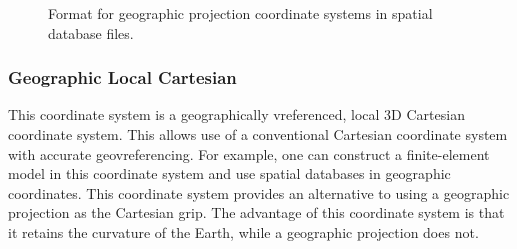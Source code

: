 \begin{figure}[H]
\caption{Format for geographic projection coordinate systems in spatial database
files.}
\end{figure}



\subsubsection{Geographic Local Cartesian}

This coordinate system is a geographically vreferenced, local 3D Cartesian
coordinate system. This allows use of a conventional Cartesian coordinate
system with accurate geovreferencing. For example, one can construct
a finite-element model in this coordinate system and use spatial databases
in geographic coordinates. This coordinate system provides an alternative
to using a geographic projection as the Cartesian grip. The advantage
of this coordinate system is that it retains the curvature of the
Earth, while a geographic projection does not.
